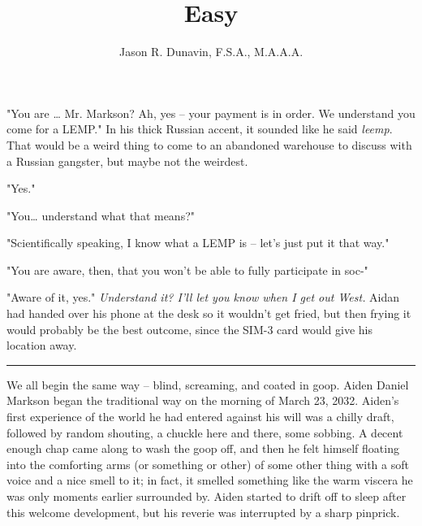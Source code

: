 \documentclass[11pt]{book}
\title{Easy}
\author{Jason R. Dunavin, F.S.A., M.A.A.A.}
\begin{document}
	\maketitle
	
	"You are … Mr. Markson? Ah, yes – your payment is in order. We understand you come for a LEMP." In his thick Russian accent, it sounded like he said \textit{leemp}. That would be a weird thing to come to an abandoned warehouse to discuss with a Russian gangster, but maybe not the weirdest.
	
	"Yes."
	
	"You… understand what that means?"
	
	"Scientifically speaking, I know what a LEMP is – let’s just put it that way."
	
	"You are aware, then, that you won’t be able to fully participate in soc-"
	
	"Aware of it, yes." \textit{Understand it? I’ll let you know when I get out West.} Aidan had handed over his phone at the desk so it wouldn’t get fried, but then frying it would probably be the best outcome, since the SIM-3 card would give his location away.
	
	\vspace{0.5cm}
	\hrule
	\vspace{0.5cm}
	
	We all begin the same way – blind, screaming, and coated in goop. Aiden Daniel Markson began the traditional way on the morning of March 23, 2032. Aiden’s first experience of the world he had entered against his will was a chilly draft, followed by random shouting, a chuckle here and there, some sobbing. A decent enough chap came along to wash the goop off, and then he felt himself floating into the comforting arms (or something or other) of some other thing with a  soft voice and a nice smell to it; in fact, it smelled something like the warm viscera he was only moments earlier surrounded by. Aiden started to drift off to sleep after this welcome development, but his reverie was interrupted by a sharp pinprick.
	
\end{document}
